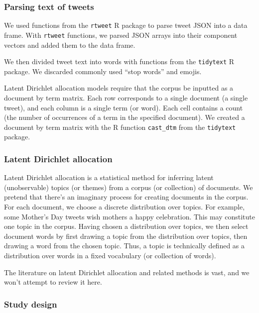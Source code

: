 \documentclass[
]{article}
\begin{document}
\hypertarget{parsing-text-of-tweets}{%
\subsubsection{Parsing text of tweets}\label{parsing-text-of-tweets}}

We used functions from the \texttt{rtweet} R package to parse tweet JSON
into a data frame. With \texttt{rtweet} functions, we parsed JSON arrays
into their component vectors and added them to the data frame.

We then divided tweet text into words with functions from the
\texttt{tidytext} R package. We discarded commonly used ``stop words''
and emojis.

Latent Dirichlet allocation models require that the corpus be inputted
as a document by term matrix. Each row corresponds to a single document
(a single tweet), and each column is a single term (or word). Each cell
contains a count (the number of occurrences of a term in the specified
document). We created a document by term matrix with the R function
\texttt{cast\_dtm} from the \texttt{tidytext} package.

\hypertarget{latent-dirichlet-allocation}{%
\subsubsection{Latent Dirichlet
allocation}\label{latent-dirichlet-allocation}}

Latent Dirichlet allocation is a statistical method for inferring latent
(unobservable) topics (or themes) from a corpus (or collection) of
documents. We pretend that there's an imaginary process for creating
documents in the corpus. For each document, we choose a discrete
distribution over topics. For example, some Mother's Day tweets wish
mothers a happy celebration. This may constitute one topic in the
corpus. Having chosen a distribution over topics, we then select
document words by first drawing a topic from the distribution over
topics, then drawing a word from the chosen topic. Thus, a topic is
technically defined as a distribution over words in a fixed vocabulary
(or collection of words).

The literature on latent Dirichlet allocation and related methods is
vast, and we won't attempt to review it here.

\hypertarget{study-design}{%
\subsubsection{Study design}\label{study-design}}
\end{document}
